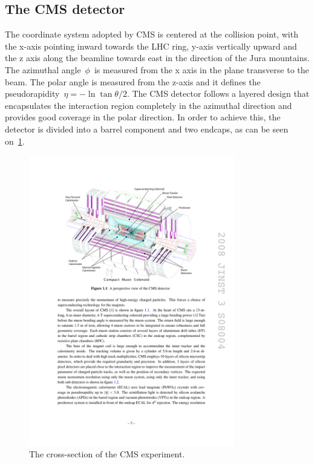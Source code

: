 \subsection{The CMS detector}
The coordinate system adopted by CMS is centered at the collision point, with the x-axis pointing inward towards the LHC ring, y-axis vertically upward and the z axis along the beamline towards east in the direction of the Jura mountains. The azimuthal angle~$\phi$~is measured from the x axis in the plane transverse to the beam. The polar angle is measured from the z-axis and it defines the pseudorapidity~$\eta = -\ln{\tan{\theta/2}}$. The CMS detector follows a layered design that encapsulates the interaction region completely in the azimuthal direction and provides good coverage in the polar direction. In order to achieve this, the detector is divided into a barrel component and two endcaps, as can be seen on~\cref{fig:cms_experiment}.

\begin{figure}
\begin{centering}
\includegraphics[width=0.8\textwidth]{figures/exp/cms.pdf}
\caption{The cross-section of the CMS experiment.}
\label{fig:cms_experiment}
\end{centering}
\end{figure}


